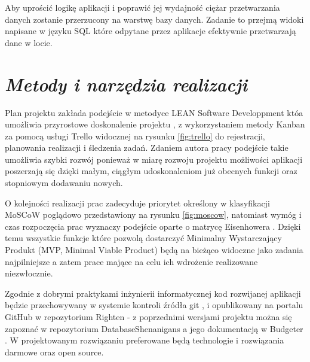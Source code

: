 \documentclass[a4paper,10pt, twoside]{report}
\newcommand{\customstylesection}[1]{\textbf{\textit{#1}}}
\begin{document}
\begin{large}
{Aby uprościć logikę aplikacji i poprawić jej wydajność ciężar przetwarzania 
danych zostanie przerzucony na warstwę bazy danych. Zadanie to przejmą widoki 
napisane w języku SQL \cite{SQL} które odpytane przez aplikacje efektywnie 
przetwarzają dane w locie.}

\section{\customstylesection{Metody i narzędzia realizacji}}
{Plan projektu zakłada podejście w metodyce LEAN Software Developpment 
\cite{LEAN} któa umożliwia przyrostowe doskonalenie projektu 
\cite{Model Przyrostowy}, z wykorzystaniem metody Kanban \cite{Kanban} za pomocą
 usługi Trello \cite{Trello} widocznej na rysunku \ref*{fig:trello} do 
rejestracji, planowania realizacji i śledzenia zadań. Zdaniem autora pracy 
podejście takie umożliwia szybki rozwój ponieważ w miarę rozwoju projektu 
możliwości aplikacji poszerzają się dzięki małym, ciągłym udoskonaleniom już 
obecnych funkcji oraz stopniowym dodawaniu nowych.}

{O kolejności realizacji prac zadecyduje priorytet określony w klasyfikacji 
MoSCoW \cite{MOSCOW} poglądowo przedstawiony na rysunku \ref{fig:moscow}, 
natomiast wymóg i czas rozpoczęcia prac wyznaczy podejście oparte o matrycę 
Eisenhowera \cite{MatrycaEisenhowera}. Dzięki temu wszystkie funkcje które 
pozwolą dostarczyć Minimalny Wystarczający Produkt (MVP, Minimal Viable Product)
 \cite{MVP} będą na bieżąco widoczne jako zadania najpilniejsze a zatem prace 
mające na celu ich wdrożenie realizowane niezwłocznie.}

{Zgodnie z dobrymi praktykami inżynierii informatycznej kod  rozwijanej 
aplikacji będzie przechowywany w systemie kontroli źródła git \cite{GIT}, i 
opublikowany na portalu GitHub \cite{GitHub} w repozytorium Righten 
\cite{GITRighten} - z poprzednimi wersjami projektu można się zapoznać w 
repozytorium DatabaseShenanigans \cite{GITBudgeterApp} a jego dokumentacją w 
Budgeter \cite{GITBudgeterDoc}. W projektowanym rozwiązaniu preferowane będą 
technologie i rozwiązania darmowe oraz open source.}


\end{large}
\end{document}
